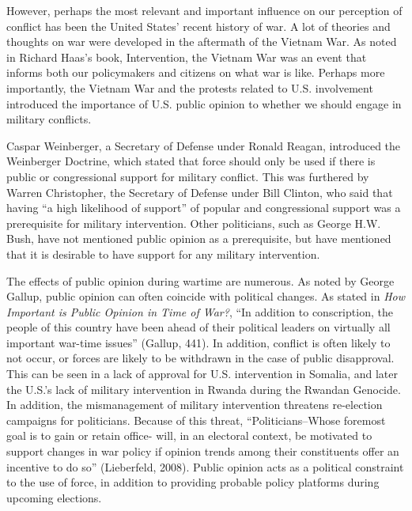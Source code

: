 \documentclass[
  11pt,
]{article}
\begin{document}
However, perhaps the most relevant and important influence on our
perception of conflict has been the United States' recent history of
war. A lot of theories and thoughts on war were developed in the
aftermath of the Vietnam War. As noted in Richard Haas's book,
Intervention, the Vietnam War was an event that informs both our
policymakers and citizens on what war is like. Perhaps more importantly,
the Vietnam War and the protests related to U.S. involvement introduced
the importance of U.S. public opinion to whether we should engage in
military conflicts.

Caspar Weinberger, a Secretary of Defense under Ronald Reagan,
introduced the Weinberger Doctrine, which stated that force should only
be used if there is public or congressional support for military
conflict. This was furthered by Warren Christopher, the Secretary of
Defense under Bill Clinton, who said that having ``a high likelihood of
support'' of popular and congressional support was a prerequisite for
military intervention. Other politicians, such as George H.W. Bush, have
not mentioned public opinion as a prerequisite, but have mentioned that
it is desirable to have support for any military intervention.

The effects of public opinion during wartime are numerous. As noted by
George Gallup, public opinion can often coincide with political changes.
As stated in \emph{How Important is Public Opinion in Time of War?},
``In addition to conscription, the people of this country have been
ahead of their political leaders on virtually all important war-time
issues'' (Gallup, 441). In addition, conflict is often likely to not
occur, or forces are likely to be withdrawn in the case of public
disapproval. This can be seen in a lack of approval for U.S.
intervention in Somalia, and later the U.S.'s lack of military
intervention in Rwanda during the Rwandan Genocide. In addition, the
mismanagement of military intervention threatens re-election campaigns
for politicians. Because of this threat, ``Politicians--Whose foremost
goal is to gain or retain office- will, in an electoral context, be
motivated to support changes in war policy if opinion trends among their
constituents offer an incentive to do so'' (Lieberfeld, 2008). Public
opinion acts as a political constraint to the use of force, in addition
to providing probable policy platforms during upcoming elections.
\end{document}
